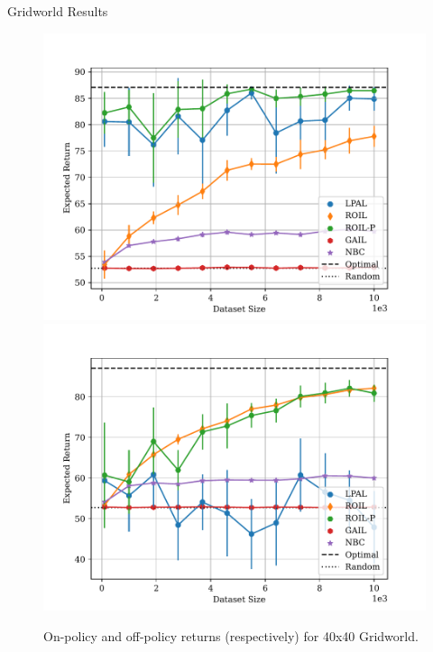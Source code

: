 \begin{block}{Gridworld Results}
    \begin{center}
        \begin{figure}
            \includegraphics[]{../pres_roil/plots/returns/40x40_gridworld_on_policy_returns.pdf}
            \includegraphics[]{../pres_roil/plots/returns/40x40_gridworld_off_policy_returns.pdf}
            \caption{On-policy and off-policy returns (respectively) for 40x40 Gridworld.}
        \end{figure}
    \end{center}
\end{block}



